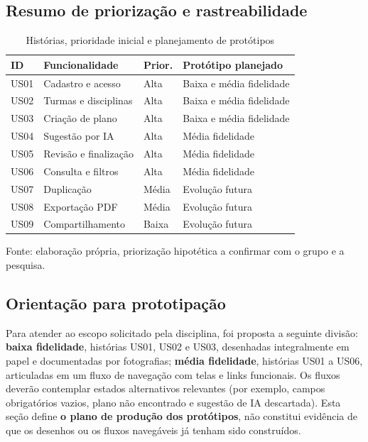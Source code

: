 \documentclass[12pt,a4paper,oneside]{report}
\begin{document}
\subsection{Resumo de priorização e rastreabilidade}
\begin{table}[htbp]
\centering
\caption{Histórias, prioridade inicial e planejamento de protótipos}
\label{tab:stories-resumo}
\small
\renewcommand{\arraystretch}{1.18}
\begin{tabularx}{\textwidth}{@{}>{\RaggedRight\arraybackslash}p{1.2cm}>{\RaggedRight\arraybackslash}X>{\RaggedRight\arraybackslash}p{1.3cm}>{\RaggedRight\arraybackslash}p{2.8cm}@{}}
\toprule
\textbf{ID} & \textbf{Funcionalidade} & \textbf{Prior.} & \textbf{Protótipo planejado} \\
\midrule
US01 & Cadastro e acesso & Alta & Baixa e média fidelidade\\
US02 & Turmas e disciplinas & Alta & Baixa e média fidelidade\\
US03 & Criação de plano & Alta & Baixa e média fidelidade\\
US04 & Sugestão por IA & Alta & Média fidelidade\\
US05 & Revisão e finalização & Alta & Média fidelidade\\
US06 & Consulta e filtros & Alta & Média fidelidade\\
US07 & Duplicação & Média & Evolução futura\\
US08 & Exportação PDF & Média & Evolução futura\\
US09 & Compartilhamento & Baixa & Evolução futura\\
\bottomrule
\end{tabularx}
\par\smallskip
\begin{minipage}{\textwidth}\footnotesize Fonte: elaboração própria, priorização hipotética a confirmar com o grupo e a pesquisa.\end{minipage}
\end{table}

\subsection{Orientação para prototipação}
Para atender ao escopo solicitado pela disciplina, foi proposta a seguinte divisão: \textbf{baixa fidelidade}, histórias US01, US02 e US03, desenhadas integralmente em papel e documentadas por fotografias; \textbf{média fidelidade}, histórias US01 a US06, articuladas em um fluxo de navegação com telas e links funcionais. Os fluxos deverão contemplar estados alternativos relevantes (por exemplo, campos obrigatórios vazios, plano não encontrado e sugestão de IA descartada). Esta seção define \textbf{o plano de produção dos protótipos}, não constitui evidência de que os desenhos ou os fluxos navegáveis já tenham sido construídos.
\end{document}
